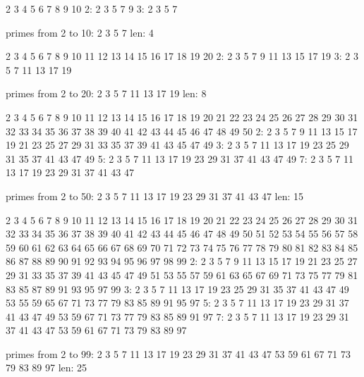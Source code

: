 \resett
\nextt
\begin{console}[frame=single, commandchars=\\\{\}]
2 3 4 5 6 7 8 9 10
2: 2 3 5 7 9
3: 2 3 5 7

primes from 2 to 10:
2 3 5 7
len: 4
\end{console}

\nextt
\begin{console}[frame=single, commandchars=\\\{\}]
2 3 4 5 6 7 8 9 10 11 12 13 14 15 16 17 18 19 20
2: 2 3 5 7 9 11 13 15 17 19
3: 2 3 5 7 11 13 17 19

primes from 2 to 20:
2 3 5 7 11 13 17 19
len: 8
\end{console}

\nextt
\begin{console}[frame=single, commandchars=\\\{\}]
2 3 4 5 6 7 8 9 10 11 12 13 14 15 16 17 18 19 20 21 22 23 24 25 26 27 28 29
30 31 32 33 34 35 36 37 38 39 40 41 42 43 44 45 46 47 48 49 50
2: 2 3 5 7 9 11 13 15 17 19 21 23 25 27 29 31 33 35 37 39 41 43 45 47 49
3: 2 3 5 7 11 13 17 19 23 25 29 31 35 37 41 43 47 49
5: 2 3 5 7 11 13 17 19 23 29 31 37 41 43 47 49
7: 2 3 5 7 11 13 17 19 23 29 31 37 41 43 47

primes from 2 to 50:
2 3 5 7 11 13 17 19 23 29 31 37 41 43 47
len: 15
\end{console}

\nextt
\begin{console}[frame=single, commandchars=\\\{\}]
2 3 4 5 6 7 8 9 10 11 12 13 14 15 16 17 18 19 20 21 22 23 24 25 26 27 28 29
30 31 32 33 34 35 36 37 38 39 40 41 42 43 44 45 46 47 48 49 50 51 52 53 54
55 56 57 58 59 60 61 62 63 64 65 66 67 68 69 70 71 72 73 74 75 76 77 78 79
80 81 82 83 84 85 86 87 88 89 90 91 92 93 94 95 96 97 98 99
2: 2 3 5 7 9 11 13 15 17 19 21 23 25 27 29 31 33 35 37 39 41 43 45 47 49 51
53 55 57 59 61 63 65 67 69 71 73 75 77 79 81 83 85 87 89 91 93 95 97 99
3: 2 3 5 7 11 13 17 19 23 25 29 31 35 37 41 43 47 49 53 55 59 65 67 71 73
77 79 83 85 89 91 95 97
5: 2 3 5 7 11 13 17 19 23 29 31 37 41 43 47 49 53 59 67 71 73 77 79 83 85
89 91 97
7: 2 3 5 7 11 13 17 19 23 29 31 37 41 43 47 53 59 61 67 71 73 79 83 89 97

primes from 2 to 99:
2 3 5 7 11 13 17 19 23 29 31 37 41 43 47 53 59 61 67 71 73 79 83 89 97
len: 25
\end{console}

